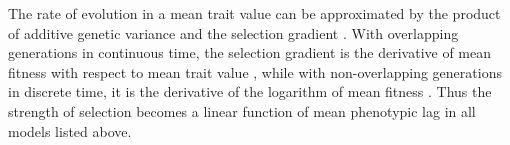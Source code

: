 \documentclass[12pt,letterpaper]{article} %
\begin{document}
The rate of evolution in a mean trait value can be approximated by the product of additive genetic variance and the selection gradient \citep[][]{Lande1976}.
With overlapping generations in continuous time, the selection gradient is the derivative of mean fitness with respect to mean trait value \citep[][equation 11]{Lande1982b}, while with non-overlapping generations in discrete time, it is the derivative of the logarithm of mean fitness \citep[][equation 7]{Lande1976}. %
Thus the strength of selection becomes a linear function of mean phenotypic lag in all models listed above. %
\end{document}
